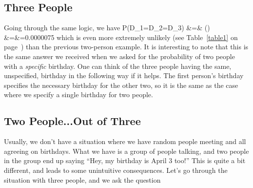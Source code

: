 \subsection{Three People}
 Going through the same logic, we have
\beqn
P(D_{1}=D_{2}=D_{3}) &=& \left(\times{}\times{}\right)\\
&=&=0.0000075
\eeqn
which is even more extremely unlikely (see Table~\ref{table1} on page~\pageref{table1}) than the previous two-person example.  It is interesting to note that this is the same answer we received when we asked for the probability of two people with a {\em specific} birthday.  One can think of the three people having the same, unspecified, birthday in the following way if it helps.  The first person's birthday specifies the necessary birthday for the other two, so it is the same as the case where we specify a single birthday for two people.

\subsection{Two People...Out of Three}

Usually, we don't have a situation where we have random people meeting and all agreeing on birthdays.  What we have is a group of people talking, and two people in the group end up saying ``Hey, my birthday is April 3 too!''  This is quite a bit different, and leads to some unintuitive consequences.  Let's go through the situation with three people, and we ask the question

